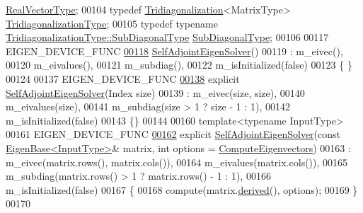 \begin{DoxyCode}
      \hyperlink{class_eigen_1_1internal_1_1_tensor_lazy_evaluator_writable}{RealVectorType};
00104     typedef \hyperlink{group___eigenvalues___module_class_eigen_1_1_tridiagonalization}{Tridiagonalization}<MatrixType> 
      \hyperlink{group___eigenvalues___module_class_eigen_1_1_tridiagonalization}{TridiagonalizationType};
00105     typedef typename \hyperlink{group___core___module_class_eigen_1_1_matrix}{TridiagonalizationType::SubDiagonalType} 
      \hyperlink{group___core___module_class_eigen_1_1_matrix}{SubDiagonalType};
00106 
00117     EIGEN\_DEVICE\_FUNC
\hyperlink{group___eigenvalues___module_af3466b3809be4a7738d84493d80d4737}{00118}     \hyperlink{group___eigenvalues___module_class_eigen_1_1_self_adjoint_eigen_solver}{SelfAdjointEigenSolver}()
00119         : m\_eivec(),
00120           m\_eivalues(),
00121           m\_subdiag(),
00122           m\_isInitialized(false)
00123     \{ \}
00124 
00137     EIGEN\_DEVICE\_FUNC
\hyperlink{group___eigenvalues___module_af20f466a4c29477271e91841e3382b27}{00138}     \textcolor{keyword}{explicit} \hyperlink{group___eigenvalues___module_af20f466a4c29477271e91841e3382b27}{SelfAdjointEigenSolver}(Index size)
00139         : m\_eivec(size, size),
00140           m\_eivalues(size),
00141           m\_subdiag(size > 1 ? size - 1 : 1),
00142           m\_isInitialized(false)
00143     \{\}
00144 
00160     \textcolor{keyword}{template}<\textcolor{keyword}{typename} InputType>
00161     EIGEN\_DEVICE\_FUNC
\hyperlink{group___eigenvalues___module_ade694ed7b0a4d9da9480cedc849be76f}{00162}     \textcolor{keyword}{explicit} \hyperlink{group___eigenvalues___module_ade694ed7b0a4d9da9480cedc849be76f}{SelfAdjointEigenSolver}(\textcolor{keyword}{const} 
      \hyperlink{group___core___module_struct_eigen_1_1_eigen_base}{EigenBase<InputType>}& matrix, \textcolor{keywordtype}{int} options = 
      \hyperlink{group__enums_ggae3e239fb70022eb8747994cf5d68b4a9ada93d8885bde32b876ba4af01d3292cc}{ComputeEigenvectors})
00163       : m\_eivec(matrix.rows(), matrix.cols()),
00164         m\_eivalues(matrix.cols()),
00165         m\_subdiag(matrix.rows() > 1 ? matrix.rows() - 1 : 1),
00166         m\_isInitialized(false)
00167     \{
00168       compute(matrix.\hyperlink{group___core___module_a324b16961a11d2ecfd2d1b7dd7946545}{derived}(), options);
00169     \}
00170 

\end{DoxyCode}

